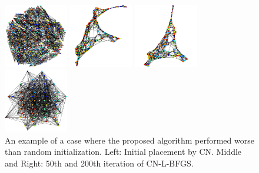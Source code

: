 \documentclass[dvipdfmx,10pt,journal,compsoc]{IEEEtran}
\begin{document}
\begin{figure}[!t]
  \centering
  \begin{minipage}{\columnwidth}
    \centering
    \begin{minipage}{0.32\columnwidth}
      \includegraphics[height=2.8cm]{overall/vis/Spectro_10NN_CN-L-BFGS_50_first.png}
    \end{minipage}
    \begin{minipage}{0.32\columnwidth}
      \includegraphics[height=2.8cm]{overall/vis/Spectro_10NN_CN-L-BFGS_50_last.png}
    \end{minipage}
    \begin{minipage}{0.32\columnwidth}
      \includegraphics[height=2.8cm]{overall/vis/Spectro_10NN_CN-L-BFGS_50_final.png}
    \end{minipage}
    \caption{
      An example of a case where the proposed algorithm performed worse than random initialization.
      Left: Initial placement by \textsf{CN}.
      Middle and Right: 50th and 200th iteration of \textsf{CN-L-BFGS}.
    }
    \label{fig:proposeIsBad}
  \end{minipage}
  \begin{minipage}{\columnwidth}
    \centering
    \begin{minipage}{0.4\columnwidth}
      \centering
      \includegraphics[height=2.8cm]{circle/vis/dense_CN-L-BFGS_10.png}

\end{minipage}
\end{minipage}
\end{figure}
\end{document}
